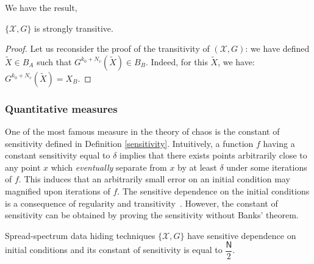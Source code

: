 \documentclass{llncs}
\begin{document}
We have the result,

\begin{proposition}
$\{\mathcal{X},G\}$ is strongly transitive.
\end{proposition}


\begin{proof}
Let us reconsider the proof of the transitivity of $(\mathcal{X}, G)$: we have defined $\tilde{X} \in B_A$ such that $G^{k_0+N_v} \left(\tilde{X}\right) \in B_B$. Indeed, for this $\tilde{X}$, we have: $G^{k_0+N_v} \left(\tilde{X}\right) = X_B$.
\end{proof}




\subsubsection{Quantitative measures}
\label{QUANTITATIVE MEASURE}


\label{par:Sensitivity}
One of the most famous measure in the theory of chaos is the constant of sensitivity defined in Definition \ref{sensitivity}. Intuitively, a function $f$ having a constant  sensitivity equal to $\delta $ implies that there exists points arbitrarily close to any point $x$ which \emph{eventually} separate from $x$ by at least $\delta $ under some iterations of $f$. This induces that an arbitrarily small error on an initial condition may magnified upon iterations of $f$. The sensitive dependence on the initial conditions is a consequence of regularity and transitivity~\cite{Banks92}. However, the constant of sensitivity can be obtained by proving the sensitivity without Banks' theorem.




\begin{proposition}
Spread-spectrum data hiding techniques $\{\mathcal{X},G\}$ have sensitive dependence on initial conditions and its constant of sensitivity is equal to $\dfrac{\mathsf{N}}{2}$.
\end{proposition}
\end{document}
